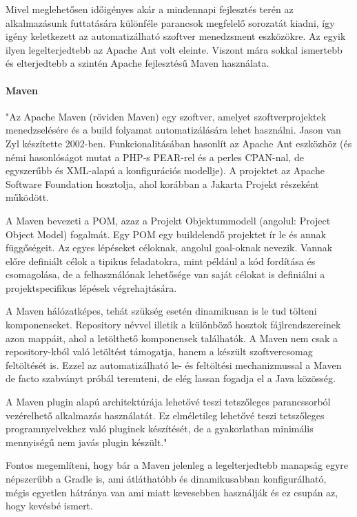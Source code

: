 Mivel meglehetősen időigényes akár a mindennapi fejlesztés terén az alkalmazásunk futtatására különféle parancsok megfelelő sorozatát kiadni, így igény keletkezett az automatizálható szoftver menedzsment eszközökre. Az egyik ilyen legelterjedtebb az Apache Ant volt eleinte. Viszont mára sokkal ismertebb és elterjedtebb a szintén Apache fejlesztésű Maven használata.

\paragraph{Maven} "Az Apache Maven (röviden Maven) egy szoftver, amelyet szoftverprojektek menedzselésére és a build folyamat automatizálására lehet használni. Jason van Zyl készítette 2002-ben. Funkcionalitásában hasonlít az Apache Ant eszközhöz (és némi hasonlóságot mutat a PHP-s PEAR-rel és a perles CPAN-nal, de egyszerűbb és XML-alapú a konfigurációs modellje). A projektet az Apache Software Foundation hosztolja, ahol korábban a Jakarta Projekt részeként működött.

A Maven bevezeti a POM, azaz a Projekt Objektummodell (angolul: Project Object Model) fogalmát. Egy POM egy buildelendő projektet ír le és annak függőségeit. Az egyes lépéseket céloknak, angolul goal-oknak nevezik. Vannak előre definiált célok a tipikus feladatokra, mint például a kód fordítása és csomagolása, de a felhasználónak lehetősége van saját célokat is definiálni a projektspecifikus lépések végrehajtására.

A Maven hálózatképes, tehát szükség esetén dinamikusan is le tud tölteni komponenseket. Repository névvel illetik a különböző hosztok fájlrendszereinek azon mappáit, ahol a letölthető komponensek találhatók. A Maven nem csak a repository-kból való letöltést támogatja, hanem a készült szoftvercsomag feltöltését is. Ezzel az automatizálható le- és feltöltési mechanizmussal a Maven de facto szabványt próbál teremteni, de elég lassan fogadja el a Java közösség.

A Maven plugin alapú architektúrája lehetővé teszi tetszőleges parancssorból vezérelhető alkalmazás használatát. Ez elméletileg lehetővé teszi tetszőleges programnyelvekhez való pluginek készítését, de a gyakorlatban minimális mennyiségű nem javás plugin készült."\cite{maven}

\vskip 0.2in
Fontos megemlíteni, hogy bár a Maven jelenleg a legelterjedtebb manapság egyre népszerűbb a Gradle is, ami átláthatóbb és dinamikusabban konfigurálható, mégis egyetlen hátránya van ami miatt kevesebben használják és ez csupán az, hogy kevésbé ismert.

